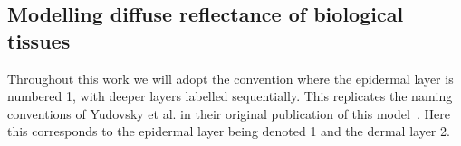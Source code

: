 
\subsection{Modelling diffuse reflectance of biological tissues}\label{sec:methodtissuemodeldouble}
Throughout this work we will adopt the convention where the epidermal layer is numbered 1, with deeper layers labelled sequentially. This replicates the naming conventions of Yudovsky et al. in their original publication of this model~\citep{Yudovsky2009}. Here this corresponds to the epidermal layer being denoted 1 and the dermal layer 2. 
%
